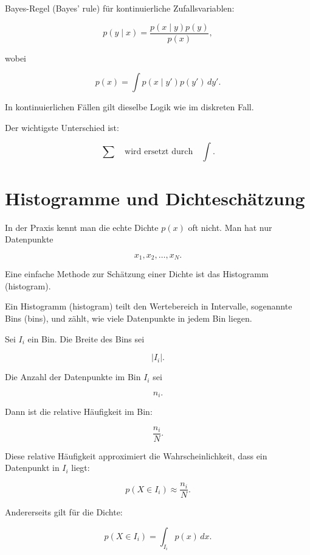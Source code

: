 \begin{definitionbox}
Bayes-Regel (Bayes' rule) für kontinuierliche Zufallsvariablen:

\[
    p(y \mid x)
    =
    \frac{
        p(x \mid y)p(y)
    }{
        p(x)
    },
\]

wobei

\[
    p(x)
    =
    \int p(x \mid y')p(y')\,dy'.
\]
\end{definitionbox}

\begin{examtipbox}
In kontinuierlichen Fällen gilt dieselbe Logik wie im diskreten Fall.

Der wichtigste Unterschied ist:

\[
    \sum
    \quad
    \text{wird ersetzt durch}
    \quad
    \int.
\]
\end{examtipbox}

\section{Histogramme und Dichteschätzung}

In der Praxis kennt man die echte Dichte \(p(x)\) oft nicht.
Man hat nur Datenpunkte

\[
    x_1,x_2,\dots,x_N.
\]

Eine einfache Methode zur Schätzung einer Dichte ist das Histogramm (histogram).

\begin{definitionbox}
Ein Histogramm (histogram) teilt den Wertebereich in Intervalle, sogenannte Bins (bins), und zählt, wie viele Datenpunkte in jedem Bin liegen.
\end{definitionbox}

Sei \(I_i\) ein Bin.
Die Breite des Bins sei

\[
    |I_i|.
\]

Die Anzahl der Datenpunkte im Bin \(I_i\) sei

\[
    n_i.
\]

Dann ist die relative Häufigkeit im Bin:

\[
    \frac{n_i}{N}.
\]

Diese relative Häufigkeit approximiert die Wahrscheinlichkeit, dass ein Datenpunkt in \(I_i\) liegt:

\[
    p(X \in I_i)
    \approx
    \frac{n_i}{N}.
\]

Andererseits gilt für die Dichte:

\[
    p(X \in I_i)
    =
    \int_{I_i} p(x)\,dx.
\]

